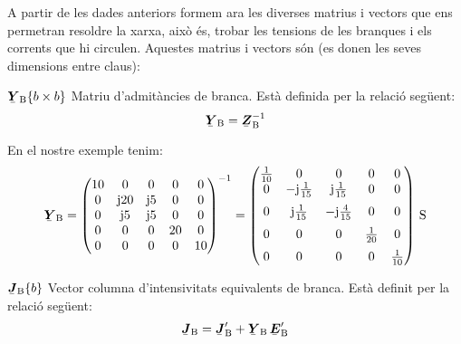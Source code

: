 A partir de les dades anteriors formem ara les diverses matrius i
vectors que ens permetran resoldre la xarxa, això és, trobar les
tensions de les branques i els corrents que hi circulen. Aquestes
matrius i vectors són (es donen les seves dimensions entre claus):

\begin{list}{}
{\setlength{\labelwidth}{20mm} \setlength{\leftmargin}{22mm} \setlength{\labelsep}{2mm}}
   \item[$\mcmplx{Y}\ped{B}\{b\times b\}$] Matriu d'admitàncies de branca. Està definida per la relació següent:
   \begin{equation}
      \mcmplx{Y}\ped{B} = \mcmplx{Z}\ped{B}^{-1}
   \end{equation}

   En el nostre exemple tenim:
   \[
      \mcmplx{Y}\ped{B} = \begin{pmatrix}
            10 & 0 & 0 & 0 & 0 \\
            0 & \ju 20 & \ju 5 & 0 & 0 \\
            0 & \ju 5 & \ju 5 & 0 & 0 \\
            0 & 0 & 0 & 20 & 0 \\
            0 & 0 & 0 & 0 & 10
      \end{pmatrix} ^{-1} =
      \begin{pmatrix}
            \frac{1}{10} & 0 & 0 & 0 & 0 \\
            0 & -\ju\frac{1}{15} & \ju\frac{1}{15} & 0 & 0 \\[2mm]
            0 & \ju\frac{1}{15} & -\ju\frac{4}{15} & 0 & 0 \\[2mm]
            0 & 0 & 0 & \frac{1}{20} & 0 \\[2mm]
            0 & 0 & 0 & 0 & \frac{1}{10}
      \end{pmatrix}\unit{S}
   \]

   \item[$\mcmplx{J}\ped{B}\{b\}$] Vector columna d'intensivitats equivalents de branca. Està definit per la relació següent:
   \begin{equation}
      \mcmplx{J}\ped{B} = \mcmplx{J}'\ped{B}  + \mcmplx{Y}\ped{B} \,\mcmplx{E}'\ped{B}
   \end{equation}


\end{list}
